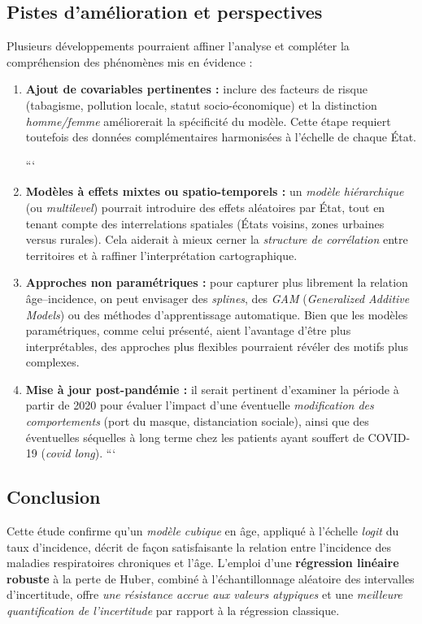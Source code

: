 \subsection{Pistes d’amélioration et perspectives}

Plusieurs développements pourraient affiner l’analyse et compléter la compréhension des phénomènes mis en évidence :
\begin{enumerate}
	\item \textbf{Ajout de covariables pertinentes :} inclure des facteurs de risque (tabagisme, pollution locale, statut socio-économique) et la distinction \emph{homme/femme} améliorerait la spécificité du modèle. Cette étape requiert toutefois des données complémentaires harmonisées à l’échelle de chaque État.
	
	```
	\item \textbf{Modèles à effets mixtes ou spatio-temporels :} un \emph{modèle hiérarchique} (ou \emph{multilevel}) pourrait introduire des effets aléatoires par État, tout en tenant compte des interrelations spatiales (États voisins, zones urbaines versus rurales). Cela aiderait à mieux cerner la \emph{structure de corrélation} entre territoires et à raffiner l’interprétation cartographique.
	
	\item \textbf{Approches non paramétriques :} pour capturer plus librement la relation âge–incidence, on peut envisager des \emph{splines}, des \emph{GAM} (\emph{Generalized Additive Models}) ou des méthodes d’apprentissage automatique. Bien que les modèles paramétriques, comme celui présenté, aient l’avantage d’être plus interprétables, des approches plus flexibles pourraient révéler des motifs plus complexes.
	
	\item \textbf{Mise à jour post-pandémie :} il serait pertinent d’examiner la période à partir de 2020 pour évaluer l’impact d’une éventuelle \emph{modification des comportements} (port du masque, distanciation sociale), ainsi que des éventuelles séquelles à long terme chez les patients ayant souffert de COVID-19 (\emph{covid long}).
	```
	
\end{enumerate}

\subsection{Conclusion}

Cette étude confirme qu’un \emph{modèle cubique} en âge, appliqué à l’échelle \emph{logit} du taux d’incidence, décrit de façon satisfaisante la relation entre l’incidence des maladies respiratoires chroniques et l’âge. L’emploi d’une \textbf{régression linéaire robuste} à la perte de Huber, combiné à l’échantillonnage aléatoire des intervalles d’incertitude, offre \emph{une résistance accrue aux valeurs atypiques} et une \emph{meilleure quantification de l’incertitude} par rapport à la régression classique.

